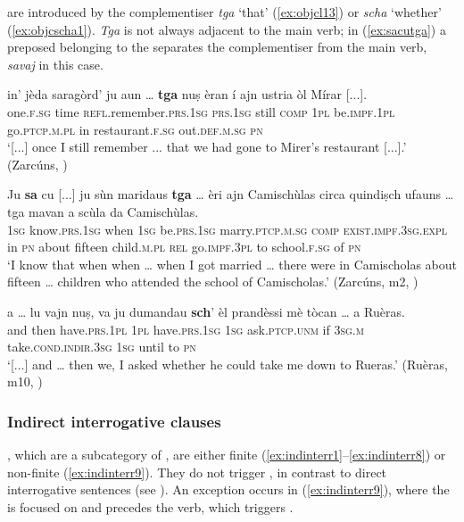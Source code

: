  are introduced by the complementiser \textit{tga} `that' (\ref{ex:objcl13}) or \textit{scha} `whether' (\ref{ex:objcscha1}). \textit{Tga} is not always adjacent to the main verb; in (\ref{ex:sacutga}) a preposed  belonging to the  separates the complementiser from the main verb, \textit{savaj} in this case.

\ea
\label{ex:objcl13}
\gll    [...] in’ jèda saragòrd’ ju aun … \textbf{tga} nuṣ èran í ajn ustria òl Mírar [...].\\
one.\textsc{f.sg} time \textsc{refl}.remember.\textsc{prs.1sg} \textsc{prs.1sg} still {} \textsc{comp} \textsc{1pl} be.\textsc{impf.1pl} go.\textsc{ptcp.m.pl} in restaurant.\textsc{f.sg} out.\textsc{def.m.sg} \textsc{pn}\\
\glt `[...] once I still remember ... that we had gone to Mirer's restaurant [...].' (Zarcúns, )
\z

\ea
\label{ex:sacutga}
\gll    Ju \textbf{sa} cu [...] ju sùn maridaus \textbf{tga} … èri ajn Camischùlas circa quindiṣch ufauns … tga mavan a scùla da Camischùlas.\\
\textsc{1sg} know.\textsc{prs.1sg} when {}  \textsc{1sg} be.\textsc{prs.1sg}  marry.\textsc{ptcp.m.sg} \textsc{comp} {} \textsc{exist.impf.3sg.expl} in \textsc{pn} about fifteen child.\textsc{m.pl} {} \textsc{rel} go.\textsc{impf.3pl} to school.\textsc{f.sg} of  \textsc{pn}\\
\glt `I know that when when … when I got married … there were in Camischolas about fifteen … children who attended the school of Camischolas.' (Zarcúns, m2, )
\z

\ea
\label{ex:objcscha1}
\gll   [...] a … lu vajn nuṣ, va ju dumandau \textbf{sch}’ èl prandèssi mè tòcan … a Ruèras. \\
{} and {} then have.\textsc{prs.1pl} \textsc{1pl} have.\textsc{prs.1sg}  \textsc{1sg} ask.\textsc{ptcp.unm} if \textsc{3sg.m} take.\textsc{cond.indir.3sg} \textsc{1sg} until {} to  \textsc{pn}\\
\glt `[...] and … then we, I asked whether he could take me down to Rueras.' (Ruèras, m10, )
\z

\subsubsection{Indirect interrogative clauses}\label{sec:6.2.1.3}
, which are a subcategory of , are either finite (\ref{ex:indinterr1}--\ref{ex:indinterr8}) or non-finite (\ref{ex:indinterr9}). They do not trigger , in contrast to direct interrogative sentences (see ). An exception occurs in (\ref{ex:indinterr9}), where the  is focused on and precedes the verb, which triggers .

